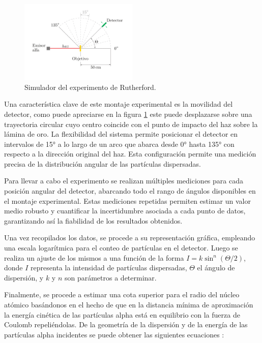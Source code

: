 \documentclass[twocolumn,a4paper,11pt]{scrartcl}
\begin{document}
\begin{figure}[h!]
    \centering
    \includegraphics[width=0.5\textwidth]{simulador.png}
    \caption{Simulador del experimento de Rutherford.}
    \label{fig:simulador}
\end{figure}

Una característica clave de este montaje experimental es la movilidad del detector, como puede apreciarse en la figura \ref{fig:simulador} este puede desplazarse sobre una trayectoria circular cuyo centro coincide con el punto de impacto del haz sobre la lámina de oro. La flexibilidad del sistema permite posicionar el detector en intervalos de 15° a lo largo de un arco que abarca desde 0° hasta 135° con respecto a la dirección original del haz. Esta configuración permite una medición precisa de la distribución angular de las partículas dispersadas.

Para llevar a cabo el experimento se realizan múltiples mediciones para cada posición angular del detector, abarcando todo el rango de ángulos disponibles en el montaje experimental. Estas mediciones repetidas permiten estimar un valor medio robusto y cuantificar la incertidumbre asociada a cada punto de datos, garantizando así la fiabilidad de los resultados obtenidos.

Una vez recopilados los datos, se procede a su representación gráfica, empleando una escala logarítmica para el conteo de partículas en el detector. Luego se realiza un ajuste de los mismos a una función de la forma $I = k \sin^n (\Theta/2)$, donde $I$ representa la intensidad de partículas dispersadas, $\Theta$ el ángulo de dispersión, y $k$ y $n$ son parámetros a determinar. 

Finalmente, se procede a estimar una cota superior para el radio del núcleo atómico basándonos en el hecho de que en la distancia mínima de aproximación la energía cinética de las partículas alpha está en equilibrio con la fuerza de Coulomb repeliéndolas. De la geometría de la dispersión y de la energía de las partículas alpha incidentes se puede obtener las siguientes ecuaciones  \cite{Symon1960}:
\end{document}
